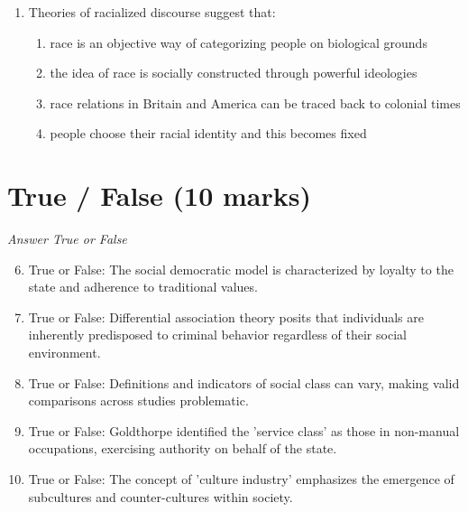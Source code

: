 \documentclass[12pt]{article}
\begin{document}
\begin{enumerate}[label=\arabic*.]
\begin{enumerate}[label=(\alph*)]
    \item the mass production of standardized products for passive audiences
    \item television based on producer-broadcaster rather than publisher-broadcaster models
    \item a diverse range of products aimed at niche markets
    \item increasing numbers of advertisements for motoring and car-related products
\end{enumerate}
\item Theories of racialized discourse suggest that:
\begin{enumerate}[label=(\alph*)]
    \item race is an objective way of categorizing people on biological grounds
    \item the idea of race is socially constructed through powerful ideologies
    \item race relations in Britain and America can be traced back to colonial times
    \item people choose their racial identity and this becomes fixed
\end{enumerate}
\end{enumerate}

\section*{True / False (10 marks)}
\textit{Answer True or False}
\begin{enumerate}[label=\arabic*.]
\setcounter{enumi}{5}
\item True or False: The social democratic model is characterized by loyalty to the state and adherence to traditional values.
\item True or False: Differential association theory posits that individuals are inherently predisposed to criminal behavior regardless of their social environment.
\item True or False: Definitions and indicators of social class can vary, making valid comparisons across studies problematic.
\item True or False: Goldthorpe identified the 'service class' as those in non-manual occupations, exercising authority on behalf of the state.
\item True or False: The concept of 'culture industry' emphasizes the emergence of subcultures and counter-cultures within society.
\end{enumerate}
\end{document}
